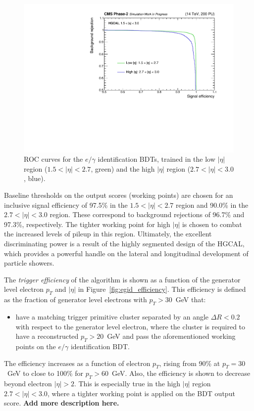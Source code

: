 \begin{figure}[htb!]
  \centering
  \includegraphics[width=.7\textwidth]{Figures/cms/egid/ROC.pdf}
  \caption[$e/\gamma$ identification ROC curve]
  {
    ROC curves for the $e/\gamma$ identification BDTs, trained in the low $|\eta|$ region ($1.5<|\eta|<2.7$, green) and the high $|\eta|$ region ($2.7<|\eta|<3.0$, blue).
  }
  \label{fig:egid_roc}
\end{figure}

Baseline thresholds on the output scores (working points) are chosen for an inclusive signal efficiency of 97.5\% in the $1.5<|\eta|<2.7$ region and 90.0\% in the $2.7<|\eta|<3.0$ region. These correspond to background rejections of 96.7\% and 97.3\%, respectively. The tighter working point for high $|\eta|$ is chosen to combat the increased levels of pileup in this region. Ultimately, the excellent discriminating power is a result of the highly segmented design of the HGCAL, which provides a powerful handle on the lateral and longitudinal development of particle showers.

The \textit{trigger efficiency} of the algorithm is shown as a function of the generator level electron $p_T$ and $|\eta|$ in Figure~\ref{fig:egid_efficiency}. This efficiency is defined as the fraction of generator level electrons with $p_T>30$~GeV that:
\begin{itemize}
    \item have a matching trigger primitive cluster separated by an angle $\Delta R<0.2$ with respect to the generator level electron, where the cluster is required to have a reconstructed $p_T>20$~GeV {and} pass the aforementioned working points on the $e/\gamma$ identification BDT.
\end{itemize}
\noindent
The efficiency increases as a function of electron $p_T$, rising from 90\% at $p_T=30$~GeV to close to 100\% for $p_T>60$~GeV. Also, the efficiency is shown to decrease beyond electron $|\eta|>2$. This is especially true in the high $|\eta|$ region $2.7<|\eta|<3.0$, where a tighter working point is applied on the BDT output score. \textbf{Add more description here.}

